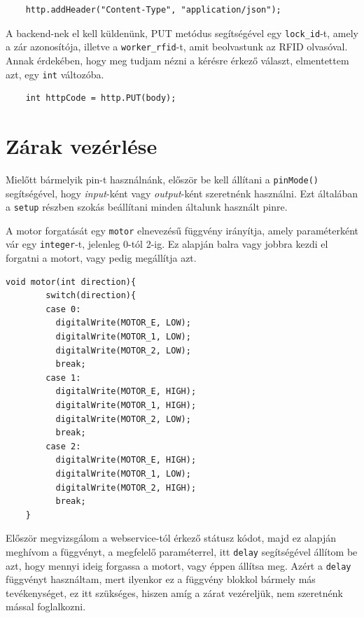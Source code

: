 \documentclass[
]{thesis-ekf}
\theoremstyle{definition}
\theoremstyle{remark}
\begin{document}
\begin{lstlisting}
    http.addHeader("Content-Type", "application/json");
\end{lstlisting}

A backend-nek el kell küldenünk, PUT metódus segítségével egy \texttt{lock\_id}-t, amely a zár azonosítója, illetve a \texttt{worker\_rfid}-t, amit beolvastunk az RFID olvasóval. Annak érdekében, hogy meg tudjam nézni a kérésre érkező választ, elmentettem azt, egy \texttt{int} változóba. 

\begin{lstlisting}
    int httpCode = http.PUT(body);
\end{lstlisting}

\section{Zárak vezérlése} \label{zár-vezérlés}
Mielőtt bármelyik pin-t használnánk, először be kell állítani a \texttt{pinMode()} segítségével, hogy \emph{input}-ként vagy \emph{output}-ként szeretnénk használni. Ezt általában a \texttt{setup} részben szokás beállítani minden általunk használt pinre.

A motor forgatását egy \texttt{motor} elnevezésű függvény irányítja, amely paraméterként vár egy \texttt{integer}-t, jelenleg 0-tól 2-ig. Ez alapján balra vagy jobbra kezdi el forgatni a motort, vagy pedig megállítja azt.

\begin{lstlisting}[caption={Motor vezérlés}]
    void motor(int direction){
        switch(direction){
        case 0:
          digitalWrite(MOTOR_E, LOW);
          digitalWrite(MOTOR_1, LOW);
          digitalWrite(MOTOR_2, LOW);
          break;
        case 1:
          digitalWrite(MOTOR_E, HIGH);
          digitalWrite(MOTOR_1, HIGH);
          digitalWrite(MOTOR_2, LOW);
          break;
        case 2:
          digitalWrite(MOTOR_E, HIGH);
          digitalWrite(MOTOR_1, LOW);
          digitalWrite(MOTOR_2, HIGH);
          break;
    }
\end{lstlisting}

Először megvizsgálom a webservice-tól érkező státusz kódot, majd ez alapján meghívom a függvényt, a megfelelő paraméterrel, itt \texttt{delay} segítségével állítom be azt, hogy mennyi ideig forgassa a motort, vagy éppen állítsa meg. Azért a \texttt{delay} függvényt használtam, mert ilyenkor ez a függvény blokkol bármely más tevékenységet, ez itt szükséges, hiszen amíg a zárat vezéreljük, nem szeretnénk mással foglalkozni.
\end{document}
